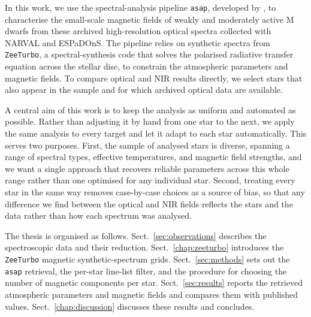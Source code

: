In this work, we use the spectral-analysis pipeline \texttt{asap}, developed by \citet{cristofari_2023a, cristofari_2023b}, to characterise the small-scale magnetic fields of weakly and moderately active M dwarfs from these archived high-resolution optical spectra collected with NARVAL and ESPaDOnS. The pipeline relies on synthetic spectra from \texttt{ZeeTurbo}, a spectral-synthesis code that solves the polarised radiative transfer equation across the stellar disc, to constrain the atmospheric parameters and magnetic fields. To compare optical and NIR results directly, we select stars that also appear in the \citet{cristofari_2023b} sample and for which archived optical data are available.


A central aim of this work is to keep the analysis as uniform and automated as possible. Rather than adjusting it by hand from one star to the next, we apply the same analysis to every target and let it adapt to each star automatically. This serves two purposes. First, the sample of analysed stars is diverse, spanning a range of spectral types, effective temperatures, and magnetic field strengths, and we want a single approach that recovers reliable parameters across this whole range rather than one optimised for any individual star. Second, treating every star in the same way removes case-by-case choices as a source of bias, so that any difference we find between the optical and NIR fields reflects the stars and the data rather than how each spectrum was analysed.

The thesis is organised as follows. Sect.~\ref{sec:observations} describes the spectroscopic data and their reduction. Sect.~\ref{chap:zeeturbo} introduces the \texttt{ZeeTurbo} magnetic synthetic-spectrum grids. Sect.~\ref{sec:methods} sets out the \texttt{asap} retrieval, the per-star line-list filter, and the procedure for choosing the number of magnetic components per star. Sect.~\ref{sec:results} reports the retrieved atmospheric parameters and magnetic fields and compares them with published values. Sect.~\ref{chap:discussion} discusses these results and concludes.